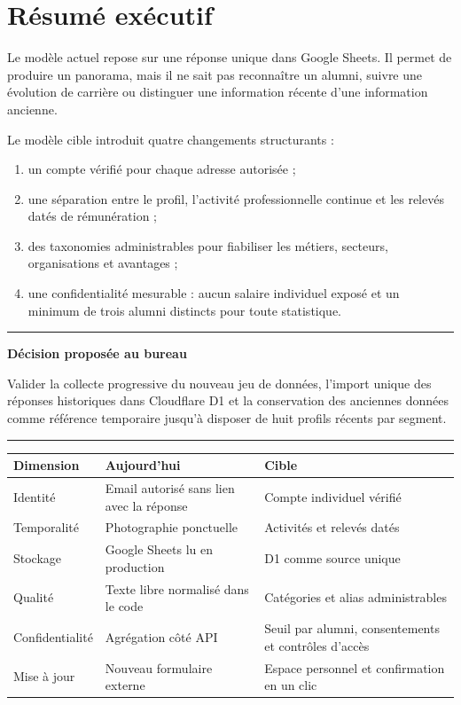 \documentclass[11pt,a4paper]{article}
\newenvironment{keybox}[1]{%
  \begin{center}
  \begin{minipage}{0.95\textwidth}
  \color{Primary}\hrule height 1pt
  \vspace{2mm}
  \textbf{\color{Primary}#1}\par\smallskip
  \color{Dark}
}{%
  \par\smallskip
  \color{Primary}\hrule height 1pt
  \end{minipage}
  \end{center}
}
\begin{document}
\tableofcontents
\clearpage

\section{Résumé exécutif}

Le modèle actuel repose sur une réponse unique dans Google Sheets. Il permet de
produire un panorama, mais il ne sait pas reconnaître un alumni, suivre une
évolution de carrière ou distinguer une information récente d'une information
ancienne.

Le modèle cible introduit quatre changements structurants :

\begin{enumerate}
  \item un compte vérifié pour chaque adresse autorisée ;
  \item une séparation entre le profil, l'activité professionnelle continue et
        les relevés datés de rémunération ;
  \item des taxonomies administrables pour fiabiliser les métiers, secteurs,
        organisations et avantages ;
  \item une confidentialité mesurable : aucun salaire individuel exposé et un
        minimum de trois alumni distincts pour toute statistique.
\end{enumerate}

\begin{keybox}{Décision proposée au bureau}
Valider la collecte progressive du nouveau jeu de données, l'import unique des
réponses historiques dans Cloudflare D1 et la conservation des anciennes
données comme référence temporaire jusqu'à disposer de huit profils récents par
segment.
\end{keybox}

\begin{tabularx}{\textwidth}{@{}L{42mm}YY@{}}
  \toprule
  \textbf{Dimension} & \textbf{Aujourd'hui} & \textbf{Cible} \\
  \midrule
  Identité & Email autorisé sans lien avec la réponse & Compte individuel vérifié \\
  Temporalité & Photographie ponctuelle & Activités et relevés datés \\
  Stockage & Google Sheets lu en production & D1 comme source unique \\
  Qualité & Texte libre normalisé dans le code & Catégories et alias administrables \\
  Confidentialité & Agrégation côté API & Seuil par alumni, consentements et contrôles d'accès \\
  Mise à jour & Nouveau formulaire externe & Espace personnel et confirmation en un clic \\
  \bottomrule
\end{tabularx}
\end{document}
